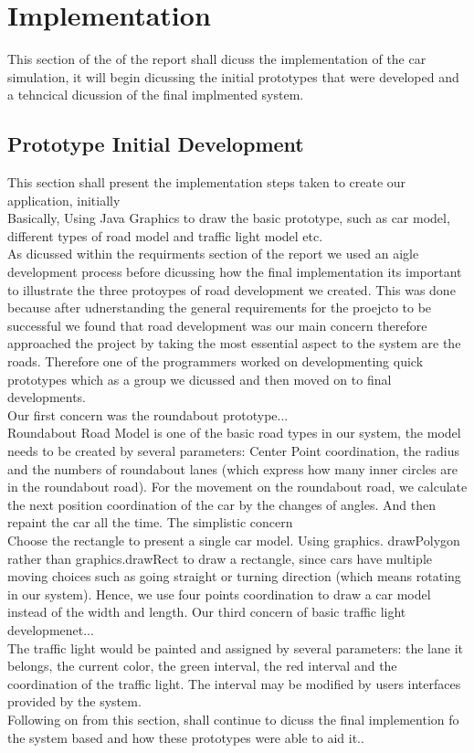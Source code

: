 \documentclass[11pt]{article}
\begin{document}
	\section{Implementation} %
This section of the of the report shall dicuss the implementation of the car simulation, it will begin dicussing the initial prototypes that were developed and a tehncical dicussion of the final implmented system. 
	\subsection{Prototype Initial Development}
This section shall present the implementation steps taken to create our application, initially 
	\\Basically, Using Java Graphics to draw the basic prototype, such as car model, different types of road model and traffic light model etc.
\\
As dicussed within the requirments section of the report we used an aigle development process before dicussing how the final implementation its important to illustrate the three protoypes of road development we created. This was done because after udnerstanding the general requirements for the proejcto to be successful we found that road development was our main concern therefore approached the project by taking the most essential aspect to the system are the roads. Therefore one of the programmers worked on developmenting quick prototypes which as a group we dicussed and then moved on to final developments.\\
Our first concern was the roundabout prototype...\\
Roundabout Road Model is one of the basic road types in our system, the model needs to be created by several parameters: Center Point coordination, the radius and the numbers of roundabout lanes (which express how many inner circles are in the roundabout road). For the movement on the roundabout road, we calculate the next position coordination of the car by the changes of angles. And then repaint the car all the time.
The simplistic concern \\
Choose the rectangle to present a single car model. Using graphics. drawPolygon rather than graphics.drawRect to draw a rectangle, since cars have multiple moving choices such as going straight or turning direction (which means rotating in our system). Hence, we use four points coordination to draw a car model instead of the width and length.
Our third concern of basic traffic light developmenet...\\
The traffic light would be painted and assigned by several parameters: the lane it belongs, the current color, the green interval, the red interval and the coordination of the traffic light. The interval may be modified by users interfaces provided by the system.
\\
Following on from this section, shall continue to dicuss the final implemention fo the system based and how these prototypes were able to aid it..
\end{document}
